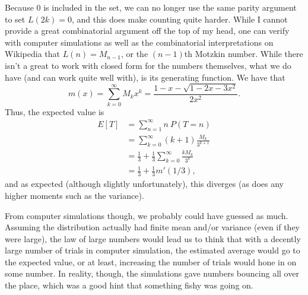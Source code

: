 \documentclass[a4paper, 12pt]{article}
\begin{document}
Because $0$ is included in the set, we can no longer use the same parity argument to set $L(2k) = 0$, and this does make counting quite harder. While I cannot provide a great combinatorial argument off the top of my head, one can verify with computer simulations as well as the combinatorial interpretations on Wikipedia that $L(n) = M_{n-1}$, or the $(n-1)$th Motzkin number. While there isn't a great to work with closed form for the numbers themselves, what we do have (and can work quite well with), is its generating function. We have that
$$m(x) = \sum_{k = 0}^{\infty} M_k x^k = \frac{1 - x - \sqrt{1 - 2x - 3x^2}}{2x^2}.$$
Thus, the expected value is
\begin{align*}
    E[T] &= \sum_{n = 1}^{\infty} n \> P(T = n) \\
    &= \sum_{k = 0}^{\infty} (k + 1) \frac{M_k}{3^{k + 1}} \\
    &= \frac{1}{3} + \frac{1}{3} \sum_{k = 0}^{\infty} \frac{k M_k}{3^k} \\
    &= \frac{1}{3} + \frac{1}{3} m'(1/3)
,\end{align*}
and as expected (although slightly unfortunately), this diverges (as does any higher moments such as the variance).


From computer simulations though, we probably could have guessed as much. Assuming the distribution actually had finite mean and/or variance (even if they were large), the law of large numbers would lead us to think that with a decently large number of trials in computer simulation, the estimated average would go to the expected value, or at least, increasing the number of trials would hone in on some number. In reality, though, the simulations gave numbers bouncing all over the place, which was a good hint that something fishy was going on.
\end{document}
